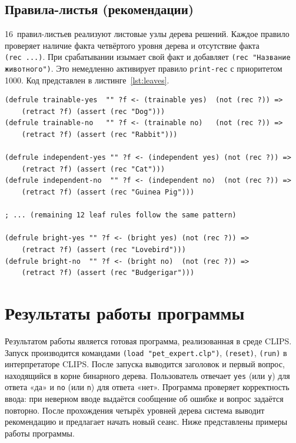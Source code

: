 \documentclass[a4paper,final]{article}
\begin{document}
\subsection{Правила-листья (рекомендации)}

16~правил-листьев реализуют листовые узлы дерева решений. Каждое правило проверяет наличие факта четвёртого уровня дерева и отсутствие факта \texttt{(rec~...)}. При срабатывании изымает свой факт и добавляет \texttt{(rec "Название животного")}. Это немедленно активирует правило \texttt{print-rec} с приоритетом 1000. Код представлен в листинге~\ref{lst:leaves}.

\begin{lstlisting}[language=CLIPS,
	caption={Правила-листья (фрагмент)},
	label=lst:leaves]
(defrule trainable-yes  "" ?f <- (trainable yes)  (not (rec ?)) =>
    (retract ?f) (assert (rec "Dog")))
(defrule trainable-no   "" ?f <- (trainable no)   (not (rec ?)) =>
    (retract ?f) (assert (rec "Rabbit")))

(defrule independent-yes "" ?f <- (independent yes) (not (rec ?)) =>
    (retract ?f) (assert (rec "Cat")))
(defrule independent-no  "" ?f <- (independent no)  (not (rec ?)) =>
    (retract ?f) (assert (rec "Guinea Pig")))

; ... (remaining 12 leaf rules follow the same pattern)

(defrule bright-yes "" ?f <- (bright yes) (not (rec ?)) =>
    (retract ?f) (assert (rec "Lovebird")))
(defrule bright-no  "" ?f <- (bright no)  (not (rec ?)) =>
    (retract ?f) (assert (rec "Budgerigar")))
\end{lstlisting}


\clearpage
\section{Результаты работы программы}

Результатом работы является готовая программа, реализованная в среде CLIPS. Запуск производится командами \texttt{(load "pet\_expert.clp")}, \texttt{(reset)}, \texttt{(run)} в интерпретаторе CLIPS. После запуска выводится заголовок и первый вопрос, находящийся в корне бинарного дерева. Пользователь отвечает \texttt{yes} (или \texttt{y}) для ответа «да» и \texttt{no} (или \texttt{n}) для ответа «нет». Программа проверяет корректность ввода: при неверном вводе выдаётся сообщение об ошибке и вопрос задаётся повторно. После прохождения четырёх уровней дерева система выводит рекомендацию и предлагает начать новый сеанс. Ниже представлены примеры работы программы.
\end{document}
